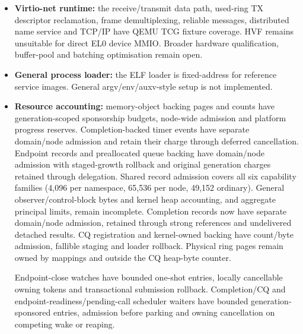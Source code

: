 \begin{itemize}
        VT-d multi-hop bridge scopes are rejected, and AMD-Vi fault delivery is
        polled until post-topology MSI setup is implemented.
    \item \textbf{Virtio-net runtime:} the receive/transmit data path, used-ring
        TX descriptor reclamation, frame demultiplexing, reliable messages,
        distributed name service and TCP/IP have QEMU TCG fixture coverage.
        HVF remains unsuitable for direct EL0 device MMIO. Broader hardware
        qualification, buffer-pool and batching optimisation remain open.
    \item \textbf{General process loader:} the ELF loader is fixed-address for
        reference service images. General argv/env/auxv-style setup is not
        implemented.
    \item \textbf{Resource accounting:} memory-object backing pages and counts
        have generation-scoped sponsorship budgets, node-wide admission and
        platform progress reserves. Completion-backed timer events have
        separate domain/node admission and retain their charge through
        deferred cancellation. Endpoint records and preallocated queue backing
        have domain/node admission with staged-growth rollback and original
        generation charges retained through delegation. Shared record admission
        covers all six capability families (4,096 per namespace, 65,536 per
        node, 49,152 ordinary). General observer/control-block bytes and kernel
        heap accounting, and aggregate principal limits, remain incomplete.
        Completion records now have separate domain/node admission, retained
        through strong references and undelivered detached results.
        CQ registration and kernel-owned backing have count/byte admission,
        fallible staging and loader rollback. Physical ring pages remain owned
        by mappings and outside the CQ heap-byte counter.
        
        Endpoint-close watches have bounded one-shot entries, locally cancellable
        owning tokens and transactional submission rollback. Completion/CQ
        and endpoint-readiness/pending-call scheduler waiters have bounded
        generation-sponsored entries, admission before parking and owning
        cancellation on competing wake or reaping.
        

\end{itemize}
